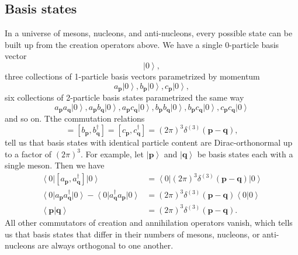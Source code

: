 \documentclass[12 pt]{article}
\newcommand{\KET}[1]{\left| #1 \right\rangle }
\newcommand{\BRA}[1]{\left\langle #1 \right| }
\newcommand{\IP}[2]{\left\langle #1 \left| #2 \right\rangle \right.}
\newcommand{\B}[1]{\mathbf{#1}}
\numberwithin{equation}{section}
\begin{document}
\subsection{Basis states}
In a universe of mesons, nucleons, and anti-nucleons, every possible state can be built up from the creation operators above. We have a single 0-particle basis vector \begin{equation*}
\KET{0},
\end{equation*}
three collections of 1-particle basis vectors parametrized by momentum \begin{equation*}
a_\B{p} \KET{0}, b_\B{p} \KET{0}, c_\B{p} \KET{0},
\end{equation*}
six collections of 2-particle basis states parametrized the same way \begin{equation*}
a_\B{p} a_\B{q} \KET{0}, a_\B{p} b_\B{q} \KET{0}, a_\B{p} c_\B{q} \KET{0}, b_\B{p} b_\B{q} \KET{0}, b_\B{p} c_\B{q} \KET{0}, c_\B{p} c_\B{q} \KET{0}
\end{equation*}
and so on. Tthe commutation relations
\begin{equation*}
[a_{\B{p}}, a^\dagger_{\B{q}}] =[b_{\B{p}}, b^\dagger_{\B{q}}] = [c_{\B{p}}, c^\dagger_{\B{q}}]  = (2 \pi)^3 \delta^{(3)}(\B{p} - \B{q}),
\end{equation*}
tell us that basis states with identical particle content are Dirac-orthonormal up to a factor of $(2\pi)^3$. For example, let $\KET{\B{p}}$ and $\KET{\B{q}}$ be basis states each with a single meson. Then we have \begin{align*}
\BRA{0} [a_{\B{p}}, a^\dagger_{\B{q}}] \KET{0} & = \BRA{0} (2 \pi)^3 \delta^{(3)}(\B{p} - \B{q}) \KET{0} \\
\BRA{0} a_{\B{p}} a^\dagger_{\B{q}} \KET{0} - \BRA{0} a^\dagger_{\B{q}} a_{\B{p}} \KET{0} & = (2 \pi)^3 \delta^{(3)}(\B{p} - \B{q}) \IP{0}{0} \\
\IP{\B{p}}{\B{q}} & = (2 \pi)^3 \delta^{(3)}(\B{p} - \B{q}).
\end{align*}
All other commutators of creation and annihilation operators vanish, which tells us that basis states that differ in their numbers of mesons, nucleons, or anti-nucleons are always orthogonal to one another.
\end{document}

